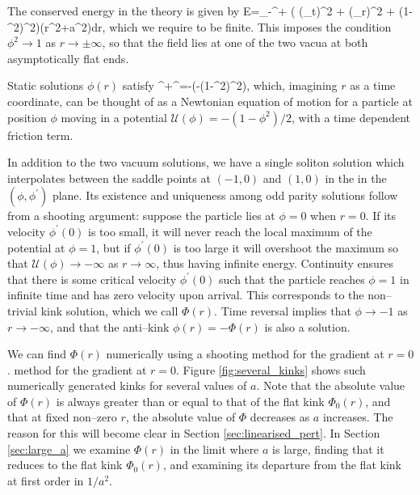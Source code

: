 The conserved energy in the theory is given by
\be
\nonumber
E=\int_{-\infty}^{+\infty} \bigg(  (\phi_t)^2 +  (\phi_r)^2 + (1-\phi^2)^2\bigg)(r^2+a^2)dr,
\ee
which we require to be finite. This imposes the condition $\phi^2\rightarrow 1$ as $r\rightarrow\pm\infty$, so that the field lies at one of the two vacua at both asymptotically flat ends.

Static solutions $\phi(r)$ satisfy
\be
\label{eom.static}
\phi^{\prime\prime}+\phi^{\prime}=-\bigg(-(1-\phi^2)^2\bigg),
\ee
which, imagining $r$ as a time coordinate, can be thought of as a Newtonian equation of motion for a particle at position $\phi$ moving in a potential $\mathcal{U}(\phi)=-(1-\phi^2)/2$, with a time dependent friction term.

In addition to the two vacuum solutions, we have a single soliton solution which interpolates between the saddle points at $(-1,0)$ and $(1,0)$ in the in the $(\phi,\phi^\prime)$ plane. Its existence and uniqueness among odd parity solutions follow from a shooting argument: suppose the particle lies at $\phi=0$ when $r=0$. If its velocity $\phi^\prime(0)$ is too small, it will never reach the local maximum of the potential at $\phi=1$, but if $\phi^\prime(0)$ is too large it will overshoot the maximum so that $\mathcal{U}(\phi)\rightarrow -\infty$ as $r\rightarrow\infty$, thus having infinite energy. Continuity ensures that there is some critical velocity $\phi^\prime(0)$ such that the particle reaches $\phi=1$ in infinite time and has zero velocity upon arrival. This corresponds to the non--trivial kink solution, which we call $\Phi(r)$. Time reversal implies that $\phi\rightarrow -1$ as $r\rightarrow -\infty$, and that the anti--kink $\phi(r)=-\Phi(r)$ is also a solution.

We can find $\Phi(r)$ numerically using a shooting method for the gradient at $r=0$. %
method for the gradient at $r=0$. Figure \ref{fig:several_kinks} shows such numerically generated kinks for several values of $a$. Note that the absolute value of $\Phi(r)$ is always greater than or equal to that of the flat kink $\Phi_0(r)$, and that at fixed non--zero $r$, the absolute value of $\Phi$ decreases as $a$ increases. The reason for this will become clear in Section \ref{sec:linearised_pert}. In Section \ref{sec:large_a} we examine $\Phi(r)$ in the limit where $a$ is large, finding that it reduces to the flat kink $\Phi_0(r)$, and examining its departure from the flat kink at first order in $1/a^2$.

